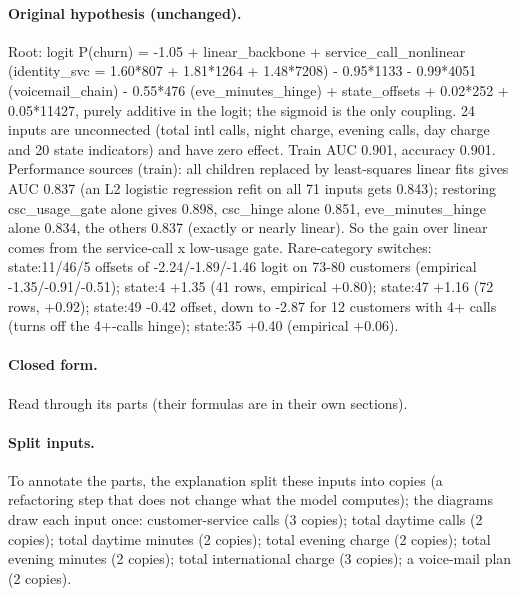\documentclass[a4paper,10pt]{article}
\newif\ifreviewmarks
\newcommand{\reviewrule}{\noindent{\color{BrickRed}\rule{\linewidth}{0.8pt}}}
\newenvironment{drafted}[1][]{%
  \ifreviewmarks\par\addvspace{\medskipamount}\reviewrule\par\nopagebreak
  \noindent{\color{BrickRed}\sffamily\footnotesize\textbf{Thesis Draft}\quad #1\hfill review}\par\nopagebreak\smallskip\fi}{%
  \ifreviewmarks\par\smallskip\noindent{\color{BrickRed}\sffamily\footnotesize end of thesis draft}\par\nopagebreak\reviewrule\par\medskip\fi}
\begin{document}
\begin{drafted}[plain-language layer: churn100-s2-c1]
\paragraph{Original hypothesis (unchanged).} Root: logit P(churn) = -1.05 + linear\_\allowbreak{}backbone + service\_\allowbreak{}call\_\allowbreak{}nonlinear (identity\_\allowbreak{}svc = 1.60*807 + 1.81*1264 + 1.48*7208) - 0.95*1133 - 0.99*4051 (voicemail\_\allowbreak{}chain) - 0.55*476 (eve\_\allowbreak{}minutes\_\allowbreak{}hinge) + state\_\allowbreak{}offsets + 0.02*252 + 0.05*11427, purely additive in the logit; the sigmoid is the only coupling. 24 inputs are unconnected (total intl calls, night charge, evening calls, day charge and 20 state indicators) and have zero effect. Train AUC 0.901, accuracy 0.901. Performance sources (train): all children replaced by least-squares linear fits gives AUC 0.837 (an L2 logistic regression refit on all 71 inputs gets 0.843); restoring csc\_\allowbreak{}usage\_\allowbreak{}gate alone gives 0.898, csc\_\allowbreak{}hinge alone 0.851, eve\_\allowbreak{}minutes\_\allowbreak{}hinge alone 0.834, the others 0.837 (exactly or nearly linear). So the gain over linear comes from the service-call x low-usage gate. Rare-category switches: state:11/46/5 offsets of -2.24/-1.89/-1.46 logit on 73-80 customers (empirical -1.35/-0.91/-0.51); state:4 +1.35 (41 rows, empirical +0.80); state:47 +1.16 (72 rows, +0.92); state:49 -0.42 offset, down to -2.87 for 12 customers with 4+ calls (turns off the 4+-calls hinge); state:35 +0.40 (empirical +0.06).
\paragraph{Closed form.} Read through its parts (their formulas are in their own sections).
\paragraph{Split inputs.} To annotate the parts, the explanation split these inputs into copies (a refactoring step that does not change what the model computes); the diagrams draw each input once: customer-service calls (3 copies); total daytime calls (2 copies); total daytime minutes (2 copies); total evening charge (2 copies); total evening minutes (2 copies); total international charge (3 copies); a voice-mail plan (2 copies).

\end{drafted}
\end{document}
